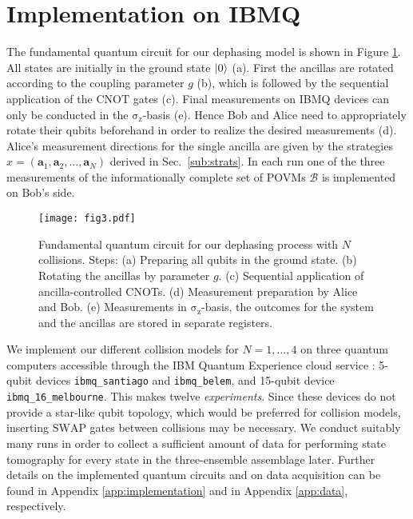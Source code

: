 \documentclass[aps,pra,twocolumn,superscriptaddress,showemail,showpacs,longbibliography]{revtex4-2}
\newcommand{\id}{\mathds{1}} %
\newcommand{\sigmaz}{\operatorname{\sigma_z}}
\renewcommand{\vec}{\mathbf}
\newcommand{\Op}[1]{\ensuremath{\mathrm{#1}}}
\begin{document}
\section{Implementation on IBMQ}
\label{sec:implementation}
The fundamental quantum circuit for our dephasing model is shown in Figure \ref{fig:fund_circ}. All states are initially in the ground state $\ket{0}$ (a). First the ancillas are rotated according to the coupling parameter $g$ (b), which is followed by the sequential application of the \Op{CNOT} gates (c). Final measurements on IBMQ devices can only be conducted in the $\sigmaz$-basis (e). Hence Bob and Alice need to appropriately rotate their qubits beforehand in order to realize the desired measurements (d). Alice's measurement directions for the single ancilla are given by the strategies $x = (\vec{a}_1, \vec{a}_2, \dots, \vec{a}_N)$ derived in Sec.~\ref{sub:strats}. In each run one of the three measurements of the informationally complete set of POVMs $\mathcal{B}$ is implemented on Bob's side.

\begin{figure}[ht]
    \centering
    \texttt{[image: fig3.pdf]}
    \caption{Fundamental quantum circuit for our dephasing process with $N$ collisions. Steps: (a) Preparing all qubits in the ground state. (b) Rotating the ancillas by parameter $g$. (c) Sequential application of ancilla-controlled CNOTs. (d) Measurement preparation by Alice and Bob. (e) Measurements in $\sigmaz$-basis, the outcomes for the system and the ancillas are stored in separate registers. }
    \label{fig:fund_circ}
\end{figure}

We implement our different collision models for $N=1,\dots,4$ on three quantum computers accessible through the IBM Quantum Experience cloud service \cite{ibmq2021}: 5-qubit devices \texttt{ibmq\_santiago} and \texttt{ibmq\_belem}, and 15-qubit device \texttt{ibmq\_16\_melbourne}. This makes twelve \emph{experiments}. Since these devices do not provide a star-like qubit topology, which would be preferred for collision models, inserting  \Op{SWAP} gates between collisions may be necessary. %
We conduct suitably many runs in order to collect a sufficient amount of data for performing state tomography for every state in the three-ensemble assemblage later. Further details on the implemented quantum circuits and on data acquisition can be found in Appendix \ref{app:implementation} and in Appendix \ref{app:data}, respectively. 
\end{document}
